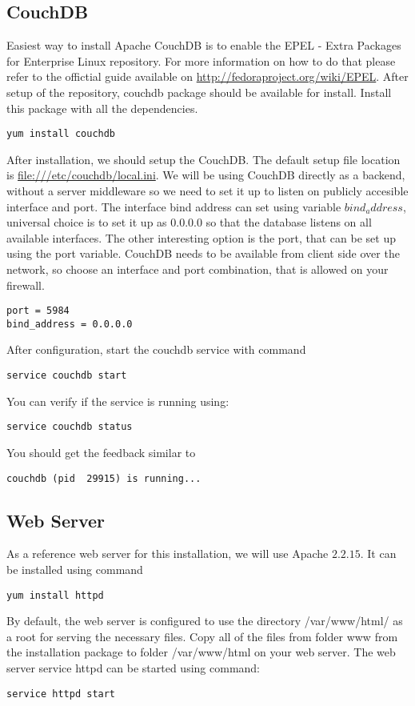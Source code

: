 \subsection{CouchDB}
Easiest way to install Apache CouchDB is to enable the EPEL - Extra Packages for
Enterprise Linux repository. For more information on how to do that please refer
to the offictial guide available on \url{http://fedoraproject.org/wiki/EPEL}.
After setup of the repository, couchdb package should be available for install.
Install this package with all the dependencies.
\begin{verbatim}
yum install couchdb
\end{verbatim}
After installation, we should setup the CouchDB. The default setup file location
is \url{file:///etc/couchdb/local.ini}. We will be using CouchDB directly as a
backend, without a server middleware so we need to set it up to listen on
publicly accesible interface and port. The interface bind address can set using
variable $bind_address$, universal choice is to set it up as $0.0.0.0$ so that
the database listens on all available interfaces. The other interesting option is
the port, that can be set up using the port variable. CouchDB needs to be
available from client side over the network, so choose an interface and port combination, that is allowed on your firewall.

\begin{verbatim}
port = 5984
bind_address = 0.0.0.0
\end{verbatim}

After configuration, start the couchdb service with command
\begin{verbatim}
service couchdb start
\end{verbatim}
You can verify if the service is running using:
\begin{verbatim}
service couchdb status
\end{verbatim}
You should get the feedback similar to
\begin{verbatim}
couchdb (pid  29915) is running...
\end{verbatim}
\subsection{Web Server}
As a reference web server for this installation, we will use Apache $2.2.15$. It
can be installed using command
\begin{verbatim}
yum install httpd
\end{verbatim}
By default, the web server is configured to use the directory /var/www/html/ as
a root for serving the necessary files. Copy all of the files from folder www from
the installation package to folder /var/www/html on your web server.
The web server service httpd can be started using command:
\begin{verbatim}
service httpd start
\end{verbatim}

